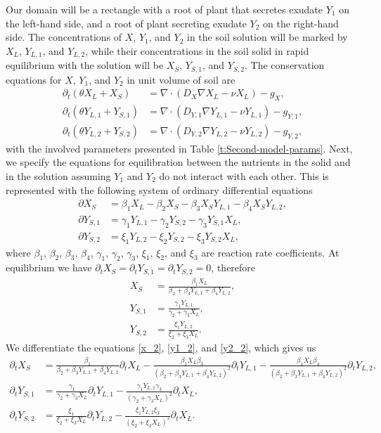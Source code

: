 \documentclass[11pt]{article}
\begin{document}
Our domain will be a rectangle with a root of plant that secretes exudate $Y_1$ on the left-hand side, and a root of plant secreting exudate $Y_2$ on the right-hand side. The concentrations of $X$, $Y_1$, and $Y_2$ in the soil solution will be marked by $X_L$, $Y_{L,1}$, and $Y_{L,2}$, while their concentrations in the soil solid in rapid equilibrium with the solution will be $X_S$, $Y_{S,1}$, and $Y_{S,2}$. The conservation equations for $X$, $Y_1$, and $Y_2$ in unit volume of soil are
\begin{align}
	\partial_t(\theta X_L + X_S) &= \nabla \cdot(D_X \nabla X_L - \nu X_L) - g_X, \label{x_1}\\
	\partial_t(\theta Y_{L,1} + Y_{S,1}) &= \nabla \cdot(D_{Y,1} \nabla Y_{L,1} - \nu Y_{L,1}) - g_{Y,1}, \label{y1_1} \\
	\partial_t(\theta Y_{L,2} + Y_{S,2}) &= \nabla \cdot(D_{Y,2} \nabla Y_{L,2} - \nu Y_{L,2}) - g_{Y,2}, \label{y2_1}		
\end{align}
with the involved parameters presented in Table \ref{t:Second-model-params}. Next, we specify the equations for equilibration between the nutrients in the solid and in the solution assuming $Y_1$ and $Y_2$ do not interact with each other. This is represented with the following system of ordinary differential equations
\begin{align}
	\partial X_S &= \beta_1 X_L - \beta_2 X_S - \beta_3 X_S Y_{L,1} - \beta_4 X_S Y_{L,2}, \\
	\partial Y_{S,1} &= \gamma_1 Y_{L,1} - \gamma_2 Y_{S,2} - \gamma_3 Y_{S,1} X_L, \\
	\partial Y_{S,2} &= \xi_1 Y_{L,2} - \xi_2 Y_{S,2} - \xi_3 Y_{S,2} X_L,
\end{align}	
where $\beta_1$, $\beta_2$, $\beta_3$, $\beta_4$, $\gamma_1$, $\gamma_2$, $\gamma_3$, $\xi_1$, $\xi_2$, and $\xi_3$ are reaction rate coefficients. At equilibrium we have $\partial_t X_S = \partial_t Y_{S,1} = \partial_t Y_{S,2} = 0$, therefore
\begin{align}
	X_S &= \frac{\beta_1 X_L}{\beta_2 + \beta_3Y_{L,1} + \beta_4 Y_{L,2}}, \label{x_2} \\
	Y_{S,1} &= \frac{\gamma_1 Y_{L,1}}{\gamma_2 + \gamma_3X_L}, \label{y1_2} \\
	Y_{S,2} &= \frac{\xi_1 Y_{L,2}}{\xi_2 + \xi_3X_L}. \label{y2_2}
\end{align}
We differentiate the equations \eqref{x_2}, \eqref{y1_2}, and \eqref{y2_2}, which gives us 
\begin{align}
	\partial_t X_S &= \frac{\beta_1}{\beta_2 + \beta_3 Y_{L,1} + \beta_4 Y_{L,2}} \partial_t X_L - \frac{\beta_1 X_L \beta_3}{(\beta_2 + \beta_3 Y_{L,1} + \beta_4 Y_{L,2})^2} \partial_t Y_{L,1}
	- \frac{\beta_1 X_L \beta_4}{(\beta_2 + \beta_3 Y_{L,1} + \beta_4 Y_{L,2})^2} \partial_t Y_{L,2}, 
	\label{x_3}
	\\
	\partial_t Y_{S,1} &= \frac{\gamma_1}{\gamma_2 + \gamma_3 X_L} \partial_t Y_{L,1} - \frac{\gamma_1 Y_{L,1} \gamma_3}{(\gamma_2 + \gamma_3 X_L)^2} \partial_t X_L, \label{y1_3}
	\\
	\partial_t Y_{S,2} &= \frac{\xi_1}{\xi_2 + \xi_3 X_L} \partial_t Y_{L,2} - \frac{\xi_1 Y_{L,2} \xi_3}{(\xi_2 + \xi_3 X_L)^2} \partial_t X_L. \label{y2_3}
\end{align} 
\end{document}
